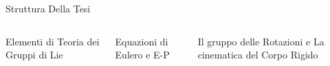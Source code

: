 \documentclass{beamer}
\begin{document}
\begin{frame}{Struttura Della Tesi}
\begin{columns}[c] %

\begin{block}{Elementi di Teoria dei Gruppi di Lie}
\end{block}
\vfill
\phantom{1}

\phantom{1}

\phantom{1}

\phantom{1}

\phantom{1}

\phantom{1}

\phantom{1}

{\begin{alertblock}{Equazioni di Eulero e E-P}
\end{alertblock}}

\begin{center}
{\begin{exampleblock}{Il gruppo delle Rotazioni e La cinematica del Corpo Rigido}
\end{exampleblock}}
\end{center}


\end{columns}
\end{frame}
\end{document}
